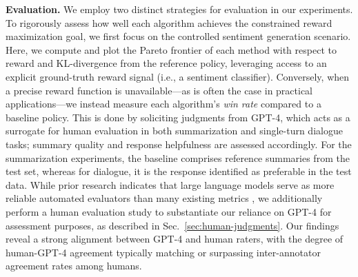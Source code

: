 \textbf{Evaluation.} We employ two distinct strategies for evaluation in our experiments. To rigorously assess how well each algorithm achieves the constrained reward maximization goal, we first focus on the controlled sentiment generation scenario. Here, we compute and plot the Pareto frontier of each method with respect to reward and KL-divergence from the reference policy, leveraging access to an explicit ground-truth reward signal (i.e., a sentiment classifier). Conversely, when a precise reward function is unavailable—as is often the case in practical applications—we instead measure each algorithm's \textit{win rate} compared to a baseline policy. This is done by soliciting judgments from GPT-4, which acts as a surrogate for human evaluation in both summarization and single-turn dialogue tasks; summary quality and response helpfulness are assessed accordingly. For the summarization experiments, the baseline comprises reference summaries from the test set, whereas for dialogue, it is the response identified as preferable in the test data. While prior research indicates that large language models serve as more reliable automated evaluators than many existing metrics \citep{Chen2023ExploringTU}, we additionally perform a human evaluation study to substantiate our reliance on GPT-4 for assessment purposes, as described in Sec.~\ref{sec:human-judgments}. Our findings reveal a strong alignment between GPT-4 and human raters, with the degree of human-GPT-4 agreement typically matching or surpassing inter-annotator agreement rates among humans.

